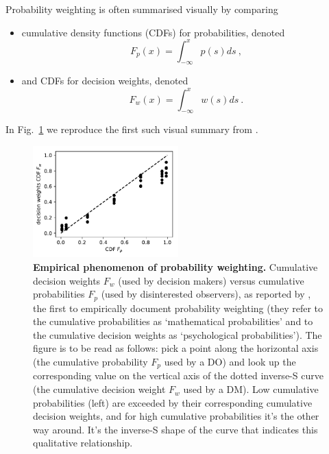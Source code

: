 \documentclass[a4paper, 12pt]{article}
\newcommand{\bi}{\begin{itemize}}
\newcommand{\ei}{\end{itemize}}
\newcommand{\elabel}[1]{\label{eq:#1}}
\newcommand{\flabel}[1]{\label{fig:#1}}
\newcommand{\fref}[1]{Fig.~\ref{fig:#1}}
\newcommand{\be}{\begin{equation}}
\newcommand{\ee}{\end{equation}}
\begin{document}
Probability weighting is often summarised visually by comparing 
\bi
\item cumulative density functions (CDFs) for probabilities, denoted 
\be
\elabel{DO_CDF}
F_p(x)=\int_{-\infty}^x p(s) ds~,
\ee
\item and CDFs for decision weights, denoted
\be
\elabel{DM_CDF}
F_w(x)=\int_{-\infty}^x w(s) ds~.
\ee
\ei
In \fref{TK1992} we reproduce the first such visual summary from \textcite[310]{TverskyKahneman1992}.
\begin{figure}[!htb]
\centering
\includegraphics[width=0.5\textwidth]{./figs/PB48_2.pdf}
\caption{\textbf{Empirical phenomenon of probability weighting.} Cumulative decision weights $F_w$ (used by decision makers) versus cumulative probabilities $F_p$ (used by disinterested observers), as reported by \textcite{PrestonBaratta1948}, the first to empirically document probability weighting (they refer to the cumulative probabilities as `mathematical probabilities' and to the cumulative decision weights as `psychological probabilities'). The figure is to be read as follows: pick a point along the horizontal axis (the cumulative probability $F_p$ used by a DO) and look up the corresponding value on the vertical axis of the dotted inverse-S curve (the cumulative decision weight $F_w$ used by a DM). Low cumulative probabilities (left) are exceeded by their corresponding cumulative decision weights, and for high cumulative probabilities it's the other way around. It's the inverse-S shape of the curve that indicates this qualitative relationship.}
\flabel{TK1992}
\end{figure}
\end{document}
